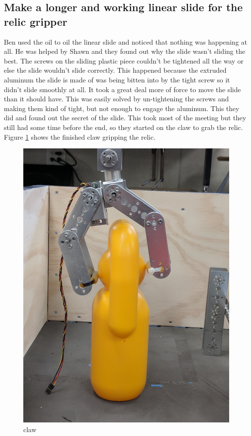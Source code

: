 \documentclass{article}
\begin{document}
\subsection{Make a longer and working linear slide for the relic gripper}
Ben used the oil to oil the linear slide and noticed that nothing was happening at all. He was helped by Shawn and they found out why the slide wasn't sliding the best. The screws on the sliding plastic piece couldn't be tightened all the way or else the slide wouldn't slide correctly. This happened because the extruded aluminum the slide is made of was being bitten into by the tight screw so it didn't slide smoothly at all. It took a great deal more of force to move the slide than it should have. This was easily solved by un-tightening the screws and making them kind of tight, but not enough to engage the aluminum. This they did and found out the secret of the slide. This took most of the meeting but they still had some time before the end, so they started on the claw to grab the relic. Figure \ref{fig:claw} shows the finished claw gripping the relic.
\begin{figure}[h]
    \centering
    \includegraphics[width=.6\textwidth]{02/images/clawgrippingrelic.jpg}
    \caption{claw}
    \label{fig:claw}
\end{figure}
\end{document}

